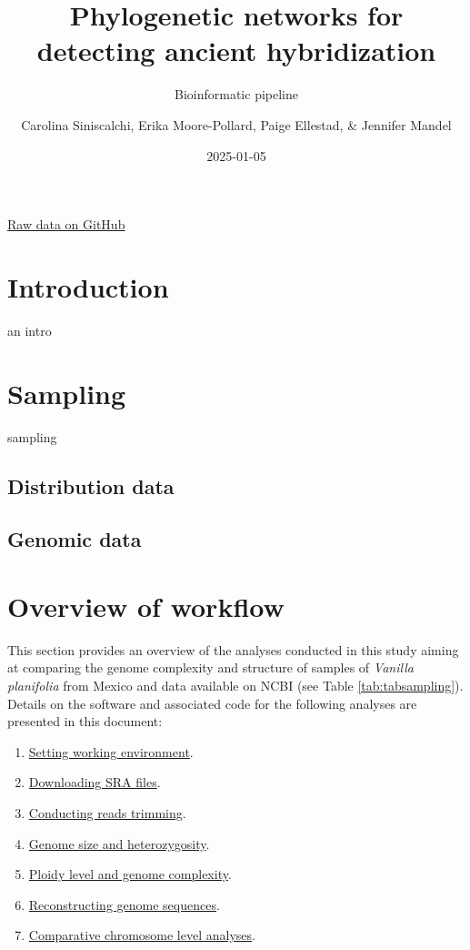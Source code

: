 \documentclass[
  12pt,
]{article}
\title{Phylogenetic networks for detecting ancient hybridization}
\subtitle{Bioinformatic pipeline}
\author{Carolina Siniscalchi, Erika Moore-Pollard, Paige Ellestad, \& Jennifer Mandel}
\date{2025-01-05}
\providecommand{\tightlist}{%
  \setlength{\itemsep}{0pt}\setlength{\parskip}{0pt}}
\begin{document}
\maketitle

{
\hypersetup{linkcolor=}
\setcounter{tocdepth}{2}
\tableofcontents
}
\href{https://github.com/svenbuerki/VanillaGenomicsCode}{Raw data on GitHub}

\hypertarget{introduction}{%
\section{Introduction}\label{introduction}}

an intro

\hypertarget{sampling}{%
\section{Sampling}\label{sampling}}

sampling

\hypertarget{distribution-data}{%
\subsection{Distribution data}\label{distribution-data}}

\hypertarget{genomic-data}{%
\subsection{Genomic data}\label{genomic-data}}

\hypertarget{overview-of-workflow}{%
\section{Overview of workflow}\label{overview-of-workflow}}

This section provides an overview of the analyses conducted in this study aiming at comparing the genome complexity and structure of samples of \emph{Vanilla planifolia} from Mexico and data available on NCBI (see Table \ref{tab:tabsampling}). Details on the software and associated code for the following analyses are presented in this document:

\begin{enumerate}
\def\labelenumi{\arabic{enumi}.}
\tightlist
\item
  \protect\hyperlink{setenv}{Setting working environment}.
\item
  \protect\hyperlink{dwndata}{Downloading SRA files}.
\item
  \protect\hyperlink{trim}{Conducting reads trimming}.
\item
  \protect\hyperlink{GS}{Genome size and heterozygosity}.
\item
  \protect\hyperlink{cyt}{Ploidy level and genome complexity}.
\item
  \protect\hyperlink{conseq}{Reconstructing genome sequences}.
\item
  \protect\hyperlink{comgen}{Comparative chromosome level analyses}.
\end{enumerate}
\end{document}
